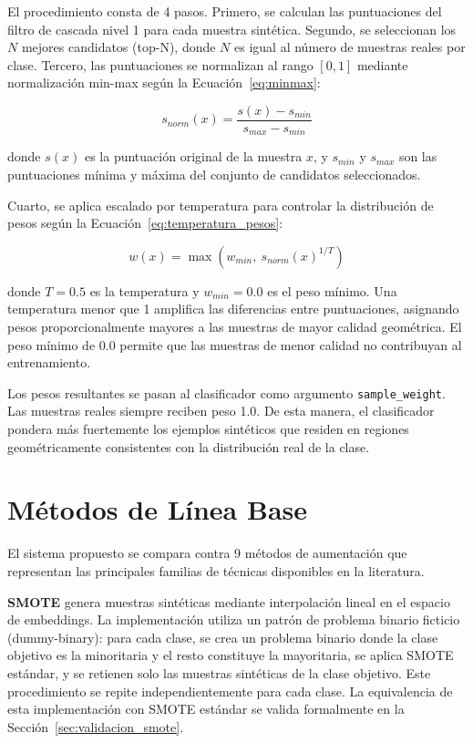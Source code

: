 El procedimiento consta de 4 pasos. Primero, se calculan las puntuaciones del filtro de cascada nivel 1 para cada muestra sintética. Segundo, se seleccionan los $N$ mejores candidatos (top-N), donde $N$ es igual al número de muestras reales por clase. Tercero, las puntuaciones se normalizan al rango $[0, 1]$ mediante normalización min-max según la Ecuación~\ref{eq:minmax}:

\begin{equation}
s_{norm}(x) = \frac{s(x) - s_{min}}{s_{max} - s_{min}}
\label{eq:minmax}
\end{equation}

donde $s(x)$ es la puntuación original de la muestra $x$, y $s_{min}$ y $s_{max}$ son las puntuaciones mínima y máxima del conjunto de candidatos seleccionados.

Cuarto, se aplica escalado por temperatura para controlar la distribución de pesos según la Ecuación~\ref{eq:temperatura_pesos}:

\begin{equation}
w(x) = \max\left(w_{min},\ s_{norm}(x)^{1/T}\right)
\label{eq:temperatura_pesos}
\end{equation}

donde $T=0.5$ es la temperatura y $w_{min}=0.0$ es el peso mínimo. Una temperatura menor que 1 amplifica las diferencias entre puntuaciones, asignando pesos proporcionalmente mayores a las muestras de mayor calidad geométrica. El peso mínimo de 0.0 permite que las muestras de menor calidad no contribuyan al entrenamiento.

Los pesos resultantes se pasan al clasificador como argumento \texttt{sample\_weight}. Las muestras reales siempre reciben peso 1.0. De esta manera, el clasificador pondera más fuertemente los ejemplos sintéticos que residen en regiones geométricamente consistentes con la distribución real de la clase.

\section{Métodos de Línea Base}
\label{sec:lineas_base}

El sistema propuesto se compara contra 9 métodos de aumentación que representan las principales familias de técnicas disponibles en la literatura.

\textbf{SMOTE} genera muestras sintéticas mediante interpolación lineal en el espacio de embeddings. La implementación utiliza un patrón de problema binario ficticio (dummy-binary): para cada clase, se crea un problema binario donde la clase objetivo es la minoritaria y el resto constituye la mayoritaria, se aplica SMOTE estándar, y se retienen solo las muestras sintéticas de la clase objetivo. Este procedimiento se repite independientemente para cada clase. La equivalencia de esta implementación con SMOTE estándar se valida formalmente en la Sección~\ref{sec:validacion_smote}.

